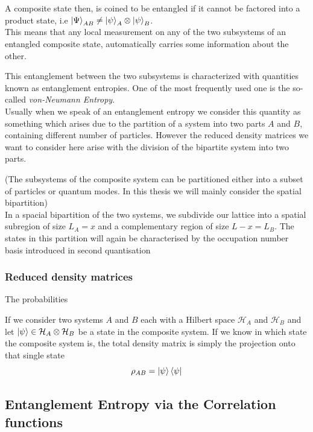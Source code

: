 \documentclass[11pt, a4paper]{article}
\theoremstyle{definition} %
\begin{document}
	
	A composite state then, is coined to be entangled if it cannot be factored into a product state, i.e $\ket{\Psi}_{AB} \neq \ket{\psi}_A \otimes \ket{\psi}_B$. \\
	
	This means that any local measurement on any of the two subsystems of an entangled composite state, automatically carries some information about the other. 
	
	
	This entanglement between the two subsystems is characterized with quantities known as entanglement entropies. One of the most frequently used one is the so-called \textit{von-Neumann Entropy}. \\
	
	Usually when we speak of an entanglement entropy we consider this quantity as something which arises due to the partition of a system into two parts $A$ and $B$, containing different number of particles. However the reduced density matrices we want to consider here arise with the division of the bipartite system into two parts.
	
	(The subsystems of the composite system can be partitioned either into a subset of particles or quantum modes. In this thesis we will mainly consider the spatial bipartition) \\
	
	In a spacial bipartition of the two systems, we subdivide our lattice into a spatial subregion of size $L_A =x$ and a complementary region of size $L-x = L_B$. The states in this partition will again be characterised by the occupation number basis introduced in second quantisation
	
	\subsubsection{Reduced density matrices}
	The probabilities 
	
	If we consider two systems $A$ and $B$ each with a Hilbert space $\mathcal{H}_A$ and $\mathcal{H}_B$ and let $\ket{\psi} \in \mathcal{H}_A \otimes \mathcal{H}_B$ be a state in the composite system. If we know in which state the composite system is, the total density matrix is simply the projection onto that single state
\begin{equation}
	\rho_{AB} = \ket{\psi}\bra{\psi}
\end{equation}
	
	
	\subsection{Entanglement Entropy via the Correlation functions}
	
\end{document}
